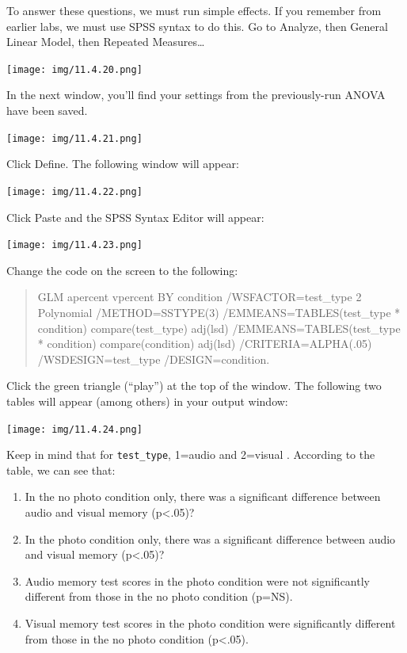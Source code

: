 \documentclass[]{book}
\providecommand{\tightlist}{%
  \setlength{\itemsep}{0pt}\setlength{\parskip}{0pt}}
\begin{document}
To answer these questions, we must run simple effects. If you remember
from earlier labs, we must use SPSS syntax to do this. Go to {Analyze},
then {General Linear Model}, then {Repeated Measures\ldots{}}

\texttt{[image: img/11.4.20.png]}

In the next window, you'll find your settings from the previously-run
ANOVA have been saved.

\texttt{[image: img/11.4.21.png]}

Click {Define}. The following window will appear:

\texttt{[image: img/11.4.22.png]}

Click {Paste} and the SPSS Syntax Editor will appear:

\texttt{[image: img/11.4.23.png]}

Change the code on the screen to the following:

\begin{quote}
GLM apercent vpercent BY condition /WSFACTOR=test\_type 2 Polynomial
/METHOD=SSTYPE(3) /EMMEANS=TABLES(test\_type * condition)
compare(test\_type) adj(lsd) /EMMEANS=TABLES(test\_type * condition)
compare(condition) adj(lsd) /CRITERIA=ALPHA(.05) /WSDESIGN=test\_type
/DESIGN=condition.
\end{quote}

Click the green triangle ({``play''}) at the top of the window. The
following two tables will appear (among others) in your output window:

\texttt{[image: img/11.4.24.png]}

Keep in mind that for \texttt{test\_type}, 1=audio and 2=visual .
According to the table, we can see that:

\begin{enumerate}
\def\labelenumi{\arabic{enumi}.}
\tightlist
\item
  In the no photo condition only, there was a significant difference
  between audio and visual memory (p\textless{}.05)?
\item
  In the photo condition only, there was a significant difference
  between audio and visual memory (p\textless{}.05)?
\item
  Audio memory test scores in the photo condition were not significantly
  different from those in the no photo condition (p=NS).
\item
  Visual memory test scores in the photo condition were significantly
  different from those in the no photo condition (p\textless{}.05).
\end{enumerate}
\end{document}
